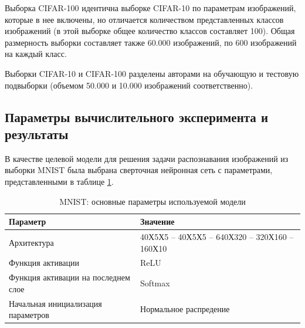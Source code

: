 Выборка CIFAR-100 идентична выборке CIFAR-10 по параметрам изображений, которые в нее включены, но отличается количеством представленных классов изображений (в этой выборке общее количество классов составляет 100). Общая размерность выборки составляет также 60.000 изображений, по 600 изображений на каждый класс.

Выборки CIFAR-10 и CIFAR-100 разделены авторами на обучающую и тестовую подвыборки (объемом 50.000 и 10.000 изображений соответственно).



\subsection{Параметры вычислительного эксперимента и результаты}

В качестве целевой модели для решения задачи распознавания изображений из выборки MNIST была выбрана сверточная нейронная сеть с параметрами, представленными в таблице \ref{table:mnist_conv_model}.

\begin{table} [!h]
  \caption{MNIST: основные параметры используемой модели}\label{table:mnist_conv_model}
\centering
\begin{tabular}{| p{7cm} | p{8cm} |}
  \hline
    \textbf{Параметр} & \textbf{Значение}\\
    \hline
    Архитектура & 40Х5Х5 -- 40Х5Х5 -- 640Х320 -- 320Х160 -- 160Х10\\
    \hline
    Функция активации & ReLU \\
    \hline
    Функция активации на последнем слое & Softmax \\
    Начальная инициализация параметров & Нормальное распредение \\
    \hline
\end{tabular}
\end{table}

